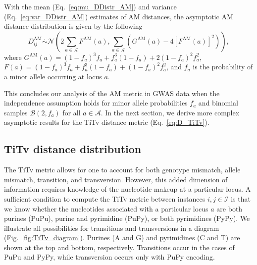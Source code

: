 \documentclass[aoas]{imsart}
\begin{document}
With the mean (Eq.~\ref{eq:mu_DDistr_AM}) and variance (Eq.~\ref{eq:var_DDistr_AM}) estimates of AM distances, the asymptotic AM distance distribution is given by the following
%
\begin{equation}\label{eq:DDistr_AM}
D^\text{AM}_{ij} \overset{.}{\sim} \mathcal{N}\left(2\sum_{a \in \mathcal{A}} F^\text{AM}(a), \sum_{a \in \mathcal{A}} \left(G^\text{AM}(a)- 4\left[F^\text{AM}(a)\right]^2\right)\right),
\end{equation}
%
where $G^\text{AM}(a) = (1 - f_a)^3 f_a + f^3_a (1 - f_a) + 2 (1 - f_a)^2 f^2_a$, $F(a) = (1 - f_a)^3 f_a + f^3_a (1 - f_a) + (1 - f_a)^2 f^2_a$, and $f_a$ is the probability of a minor allele occurring at locus $a$.

This concludes our analysis of the AM metric in GWAS data when the independence assumption holds for minor allele probabilities $f_a$ and binomial samples $\mathcal{B}(2,f_a)$ for all $a \in \mathcal{A}$. In the next section, we derive more complex asymptotic results for the TiTv distance metric (Eq.~\ref{eq:D_TiTv}).

\subsection{TiTv distance distribution}\label{sec:TiTv_distances}

The TiTv metric allows for one to account for both genotype mismatch, allele mismatch, transition, and transversion. However, this added dimension of information requires knowledge of the nucleotide makeup at a particular locus. A sufficient condition to compute the TiTv metric between instances $i,j \in \mathcal{I}$ is that we know whether the nucleotides associated with a particular locus $a$ are both purines (PuPu), purine and pyrimidine (PuPy), or both pyrimidines (PyPy). We illustrate all possibilities for transitions and transversions in a diagram (Fig.~\ref{fig:TiTv_diagram}). Purines (A and G) and pyrimidines (C and T) are shown at the top and bottom, respectively. Transitions occur in the cases of PuPu and PyPy, while transversion occurs only with PuPy encoding.
\end{document}
